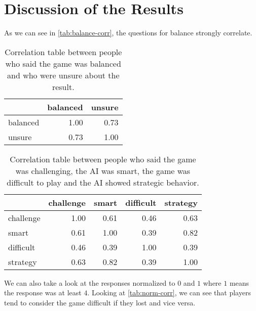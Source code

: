 \section{Discussion of the Results}

As we can see in \autoref{tab:balance-corr}, the questions for balance strongly correlate.

\begin{table}[h]
	\centering
	\begin{tabular}{lrr}
		\toprule
		{} &  balanced &  unsure \\
		\midrule
		balanced &      1.00 &    \cellcolor{blue!25}0.73 \\
		unsure   &      0.73 &    1.00 \\
		\bottomrule
	\end{tabular}
	\caption{Correlation table between people who said the game was balanced and who were unsure about the result.}	
	\label{tab:balance-corr}
\end{table}

\begin{table}[h]
	\centering
	\begin{tabular}{lrrrr}
		\toprule
		{} &  challenge &  smart &  difficult &  strategy \\
		\midrule
		challenge &       1.00 &   0.61 &       0.46 &      0.63 \\
		smart     &       0.61 &   1.00 &       0.39 &      \cellcolor{blue!25}0.82 \\
		difficult &       0.46 &   0.39 &       1.00 &      0.39 \\
		strategy  &       0.63 &   0.82 &       0.39 &      1.00 \\
		\bottomrule
	\end{tabular}
	\caption{Correlation table between people who said the game was challenging, the AI was smart, the game was difficult to play and the AI showed strategic behavior.}
	\label{tab:difficulty-corr}
\end{table}


We can also take a look at the responses normalized to $0$ and $1$ where $1$ means
the response was at least $4$. Looking at \autoref{tab:norm-corr}, we can see that players
tend to consider the game difficult if they lost and vice versa.

